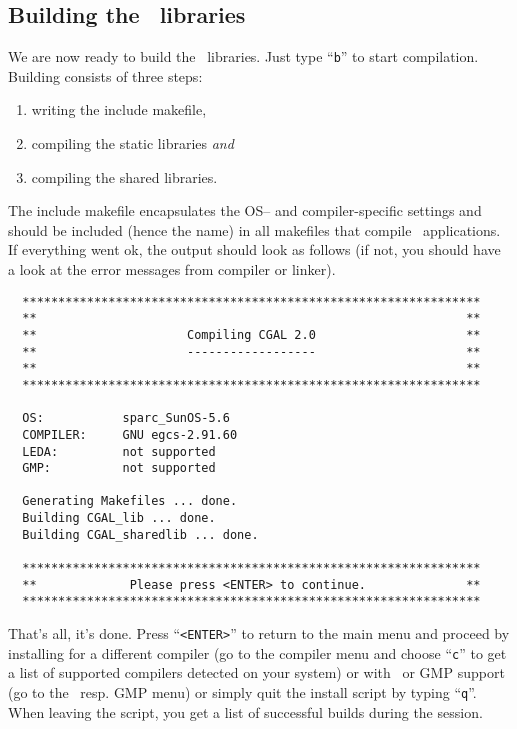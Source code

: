 \subsection{Building the \cgal\ libraries}\label{sec:build-the-libs}

We are now ready to build the \cgal\ libraries.  Just type ``{\tt b}''
to start compilation. Building consists of three steps:
\begin{enumerate}
\item writing the include makefile,
\item compiling the static libraries \textit{and}
\item compiling the shared libraries.
\end{enumerate}
The include makefile encapsulates the OS-- and compiler-specific
settings and should be included (hence the name) in all makefiles that
compile \cgal\ applications. If everything went ok, the output should
look as follows (if not, you should have a look at the error messages
from compiler or linker).

{\ccTexHtml{\scriptsize}{}
\begin{verbatim}
  ****************************************************************
  **                                                            **
  **                     Compiling CGAL 2.0                     **
  **                     ------------------                     **
  **                                                            **
  ****************************************************************

  OS:           sparc_SunOS-5.6
  COMPILER:     GNU egcs-2.91.60
  LEDA:         not supported
  GMP:          not supported

  Generating Makefiles ... done.
  Building CGAL_lib ... done.
  Building CGAL_sharedlib ... done.

  ****************************************************************
  **             Please press <ENTER> to continue.              **
  ****************************************************************
\end{verbatim}}

That's all, it's done. Press ``\texttt{<ENTER>}'' to return to the main
menu and proceed by installing for a different compiler (go to the
compiler menu and choose ``\texttt{c}'' to get a list of supported
compilers detected on your system) or with \leda\ or GMP support (go
to the \leda\ resp.  GMP menu) or simply quit the install script by
typing ``\texttt{q}''. When leaving the script, you get a list of
successful builds during the session.

